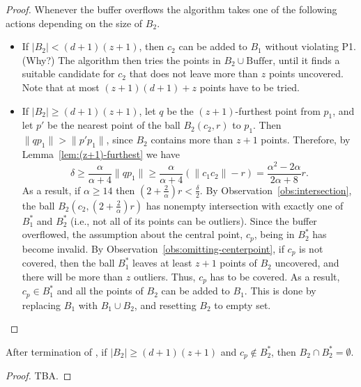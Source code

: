 \documentclass[envcountsame]{cls/cccg15}
\newcommand{\rc}{r}
\newcommand{\cp}{c_p}
\newcommand{\dz}{(d + 1)(z + 1)}
\newcommand{\card}[1]{\left|{#1}\right|}
\newcommand{\len}[1]{\|{#1}\|}
\newcommand{\gee}{\geqslant}
\renewcommand{\geq}{\gee}
\renewcommand{\ge}{\gee}
\begin{document}
\begin{proof}
Whenever the buffer overflows 
the algorithm takes one of the following actions
depending on the size of $B_2$. 

\begin{itemize}
\item 
If $|B_2| < \dz$, then $c_2$ can be added to $B_1$
without violating P1. (Why?) 
The algorithm then tries the points in $B_2 \cup \mbox{Buffer}$, 
until it finds a suitable candidate for $c_2$ that does not leave
more than $z$ points uncovered. 
Note that at most $(z+1)(d+1) + z$ points have to be tried. 

\item 
If $\card{B_2} \ge \dz$, let $q$ be the $(z+1)$-furthest point from $p_1$,
and let $p'$ be the nearest point of the ball $B_2(c_2, \rc )$ to $p_1$. 
Then $\len{qp_1} > \len{p'p_1}$, since $B_2$ contains more than $z+1$ points. 
Therefore, by Lemma~\ref{lem:(z+1)-furthest} we have
\[
\delta \ge \frac{\alpha }{\alpha+4}\len{qp_1} \ge \frac{\alpha}{\alpha+4} (\len{c_1c_2} - \rc ) = \frac{\alpha^2 - 2\alpha}{2\alpha + 8} \rc.
\]
As a result, if $\alpha \geq 14$ then $(2 + \frac{2}{\alpha}) \rc  < \frac{\delta}{2}$. 
By Observation~\ref{obs:intersection}, the ball $B_2(c_2, (2 + \frac{2}{\alpha}) \rc )$ 
has nonempty intersection with exactly one of $B_1^*$ and $B_2^*$ 
(i.e., not all of its points can be outliers). 
Since the buffer overflowed, the assumption about the central point, 
$\cp$, being in $B_2^*$ has become invalid. 
By Observation~\ref{obs:omitting-centerpoint}, if $\cp$ is not covered, 
then the ball $B_1^*$ leaves at least $z+1$ points of $B_2$ uncovered, 
and there will be more than $z$ outliers. 
Thus, $\cp$ has to be covered. 
As a result, $\cp \in B_1^*$ and all the points of $B_2$ can be added to $B_1$. 
This is done by replacing $B_1$ with $B_1 \cup B_2$, and resetting $B_2$ to empty set.
\end{itemize}
\end{proof}


\begin{lemma}
\label{lem:}
	After termination of , 
	if $|B_2| \ge \dz$ and $\cp \not\in B_2^*$,
	then $B_2 \cap B_2^* = \emptyset$.
\end{lemma}

\begin{proof}
	TBA.
\end{proof}
\end{document}
